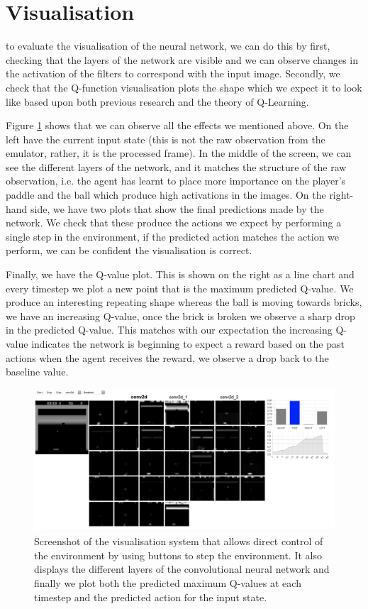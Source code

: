 \section{Visualisation}
to evaluate the visualisation of the neural network, we can do this by first, checking that the layers of the network are visible and we can observe changes in the activation of the filters to correspond with the input image. Secondly, we check that the Q-function visualisation plots the shape which we expect it to look like based upon both previous research and the theory of Q-Learning.

Figure \ref{fig:vis_system_screenshot} shows that we can observe all the effects we mentioned above. On the left have the current input state (this is not the raw observation from the emulator, rather, it is the processed frame). In the middle of the screen, we can see the different layers of the network, and it matches the structure of the raw observation, i.e. the agent has learnt to place more importance on the player's paddle and the ball which produce high activations in the images. On the right-hand side, we have two plots that show the final predictions made by the network. We check that these produce the actions we expect by performing a single step in the environment, if the predicted action matches the action we perform, we can be confident the visualisation is correct.

Finally, we have the Q-value plot. This is shown on the right as a line chart and every timestep we plot a new point that is the maximum predicted Q-value. We produce an interesting repeating shape whereas the ball is moving towards bricks, we have an increasing Q-value, once the brick is broken we observe a sharp drop in the predicted Q-value. This matches with our expectation the increasing Q-value indicates the network is beginning to expect a reward based on the past actions when the agent receives the reward, we observe a drop back to the baseline value.

\begin{figure}[htbp]
  \centering
  \includegraphics[width=1.0\textwidth]{chapters/chapter5/images/vis_screen.png}
  \caption[Screenshot of visualisation system]{Screenshot of the visualisation system that allows direct control of the environment by using buttons to step the environment. It also displays the different layers of the convolutional neural network and finally we plot both the predicted maximum Q-values at each timestep and the predicted action for the input state.
    \label{fig:vis_system_screenshot}
  }
\end{figure}
